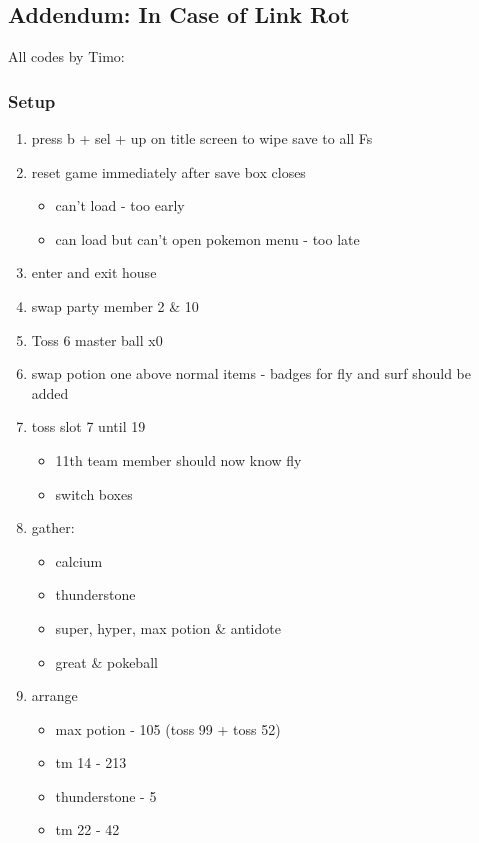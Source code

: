 \documentclass[../main.tex]{subfiles}
\begin{document}
    \subsection{Addendum: In Case of Link Rot}
    All codes by Timo:

    \subsubsection{Setup}
    \begin{enumerate}
        \item press b + sel + up on title screen to wipe save to all Fs
        \item reset game immediately after save box closes\begin{itemize}
            \item can't load - too early
            \item can load but can't open pokemon menu - too late
        \end{itemize}
        \item enter and exit house
        \item swap party member 2 \& 10
        \item Toss 6 master ball x0
        \item swap potion one above normal items - badges for fly and surf should be added
        \item toss slot 7 until 19\begin{itemize}
            \item 11th team member should now know fly
            \item switch boxes
        \end{itemize}
        \item gather:\begin{itemize}
            \item calcium
            \item thunderstone
            \item super, hyper, max potion \& antidote
            \item great \& pokeball
        \end{itemize}
        \item arrange\begin{itemize}
            \item max potion - 105 (toss 99 + toss 52)
            \item tm 14  - 213
            \item thunderstone - 5
            \item tm 22 - 42

\end{itemize}
\end{enumerate}
\end{document}
